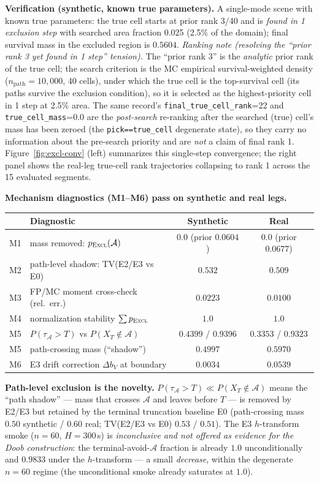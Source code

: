 \documentclass[11pt]{article}
\newcommand{\Aregion}{\mathcal{A}}
\newcommand{\Excl}{\textsc{Excl}}
\begin{document}
\textbf{Verification (synthetic, known true parameters).} A single-mode
scene with known true parameters: the true cell starts at prior rank 3/40
and is \emph{found in 1 exclusion step} with searched area fraction 0.025
(2.5\% of the domain); final survival mass in the excluded region is
$0.5604$.  \emph{Ranking note (resolving the ``prior rank 3 yet found in 1
step'' tension).} The ``prior rank 3'' is the \emph{analytic} prior rank of
the true cell; the search criterion is the MC empirical survival-weighted
density ($n_{\mathrm{path}}{=}10{,}000$, 40 cells), under which the true
cell is the top-survival cell (its paths survive the exclusion condition),
so it is selected as the highest-priority cell in 1 step at 2.5\% area.  The
same record's \texttt{final\_true\_cell\_rank}=22 and
\texttt{true\_cell\_mass}=0.0 are the \emph{post-search} re-ranking after the
searched (true) cell's mass has been zeroed (the \texttt{pick==true\_cell}
degenerate state), so they carry no information about the pre-search priority
and are \emph{not} a claim of final rank 1.  Figure~\ref{fig:excl-conv} (left)
summarizes this single-step convergence; the right panel shows the real-leg
true-cell rank trajectories collapsing to rank 1 across the 15 evaluated
segments.

\textbf{Mechanism diagnostics (M1--M6) pass on synthetic and real legs.}
\begin{center}
\small
\begin{tabular}{llcc}
\toprule
 & Diagnostic & Synthetic & Real \\
\midrule
M1 & mass removed: $p_{\Excl}(\Aregion)$ & $0.0$ (prior $0.0604$) & $0.0$ (prior $0.0677$) \\
M2 & path-level shadow: TV(E2/E3 vs E0) & $0.532$ & $0.509$ \\
M3 & FP/MC moment cross-check (rel.\ err.) & $0.0223$ & $0.0100$ \\
M4 & normalization stability $\sum p_{\Excl}$ & $1.0$ & $1.0$ \\
M5 & $P(\tau_{\Aregion}{>}T)$ vs $P(X_T{\notin}\Aregion)$ & $0.4399$ / $0.9396$ & $0.3353$ / $0.9323$ \\
M5 & path-crossing mass (``shadow'') & $0.4997$ & $0.5970$ \\
M6 & E3 drift correction $\Delta b_V$ at boundary & $0.0034$ & $0.0539$ \\
\bottomrule
\end{tabular}
\end{center}

\textbf{Path-level exclusion is the novelty.} $P(\tau_{\Aregion}{>}T)\ll
P(X_T{\notin}\Aregion)$ means the ``path shadow'' --- mass that crosses $\Aregion$ and
leaves before $T$ --- is removed by E2/E3 but retained by the terminal
truncation baseline E0 (path-crossing mass $0.50$ synthetic / $0.60$ real;
TV(E2/E3 vs E0) $0.53$ / $0.51$).  The E3 $h$-transform smoke
($n{=}60$, $H{=}300$\,s) is \emph{inconclusive and not offered as evidence for
the Doob construction}: the terminal-avoid-$\Aregion$ fraction is already
$1.0$ unconditionally and $0.9833$ under the $h$-transform --- a small
\emph{decrease}, within the degenerate $n{=}60$ regime (the unconditional
smoke already saturates at $1.0$).
\end{document}
